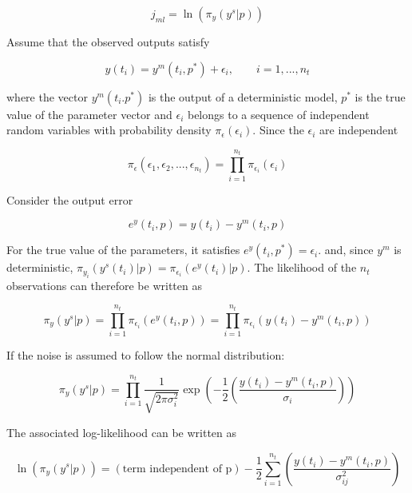 \documentclass[]{scrartcl}
\begin{document}
\begin{equation}
	j_{ml} = \ln ( \pi_y (y^s|p) )
\end{equation}

Assume that the observed outputs satisfy 

\begin{equation}
	y(t_i) = y^m(t_i, p^*) + \epsilon_i, \qquad i=1,...,n_t
\end{equation}

where the vector $y^m(t_i. p^*)$ is the output of a deterministic model, $p^*$ is the true value of the parameter vector and $\epsilon_i$ belongs to a sequence of independent random variables with probability density $\pi_{\epsilon}(\epsilon_i)$. Since the $\epsilon_i$ are independent

\begin{equation}
	\pi_{\epsilon}(\epsilon_1, \epsilon_2, ..., \epsilon_{n_t}) = \prod_{i=1}^{n_t} \pi_{\epsilon_i}(\epsilon_i)
\end{equation}

Consider the output error

\begin{equation}
	e^y(t_i, p) = y(t_i) - y^m(t_i, p)
\end{equation}

For the true value of the parameters, it satisfies $e^y(t_i, p^*)=\epsilon_i$. and, since $y^m$ is deterministic, $\pi_{y_i} (y^s(t_i)|p) = \pi_{\epsilon_i} (e^y(t_i)|p)$. The likelihood of the $n_t$ observations can therefore be written as

\begin{equation}
	 \pi_y (y^s|p) = \prod_{i=1}^{n_t} \pi_{\epsilon_i}(e^y(t_i,p)) =  \prod_{i=1}^{n_t} \pi_{\epsilon_i}(y(t_i) - y^m(t_i, p))
\end{equation}

If the noise is assumed to follow the normal distribution:

\begin{equation}
	\pi_y (y^s|p) = \prod_{i=1}^{n_t} \frac{1}{ \sqrt{2\pi\sigma_i^2} } \exp \left( -\frac{1}{2} \left( \frac{y(t_i) - y^m(t_i, p)}{\sigma_i} \right) \right)
\end{equation}

The associated log-likelihood can be written as

\begin{equation}
	\ln (\pi_y (y^s|p)) = (\text{term independent of p}) - \frac{1}{2} \sum_{i=1}^{n_t}  \left( \frac{y(t_i) - y^m(t_i, p)}{\sigma_{ij}^2} \right)
\end{equation}
\end{document}
